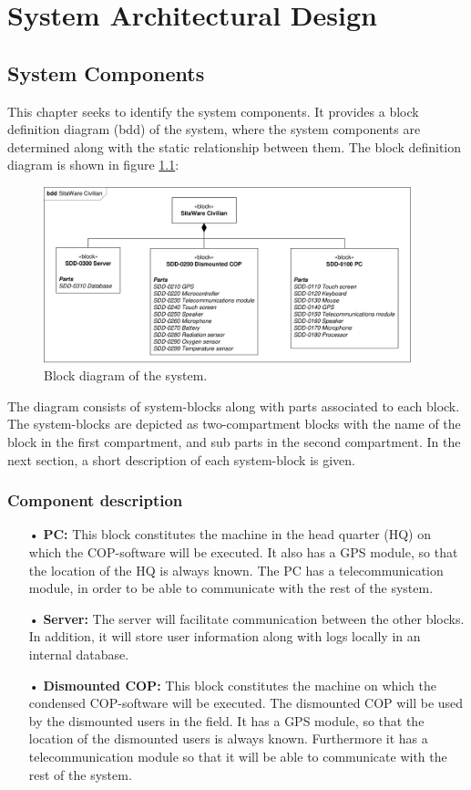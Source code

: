 \chapter{System Architectural Design}
\section{System Components}
This chapter seeks to identify the system components. It provides a block definition diagram (bdd) of the system, where the system components are determined along with the static relationship between them. The block definition diagram is shown in figure \ref{fig:block_diagram}:
\begin{figure}[H]
\centering
\includegraphics[width=0.95\textwidth]
{billeder/bdd_overordnet.pdf}
\caption{Block diagram of the system.}
\label{fig:block_diagram}
\end{figure}
The diagram consists of system-blocks along with parts associated to each block. The system-blocks are depicted as two-compartment blocks with the name of the block in the first compartment, and sub parts in the second compartment. In the next section, a short description of each system-block is given.
\subsection{Component description}
\begin{enumerate}
\item[•] \textbf{PC:} This block constitutes the machine in the head quarter (HQ) on which the COP-software will be executed. It also has a GPS module, so that the location of the HQ is always known. The PC has a telecommunication module, in order to be able to communicate with the rest of the system.
\item[•] \textbf{Server:} The server will facilitate communication between the other blocks. In addition, it will store user information along with logs locally in an internal database.
\item[•] \textbf{Dismounted COP:} This block constitutes the machine on which the condensed COP-software will be executed. The dismounted COP will be used by the dismounted users in the field. It has a GPS module, so that the location of the dismounted users is always known. Furthermore it has a telecommunication module so that it will be able to communicate with the rest of the system. 
\end{enumerate}


